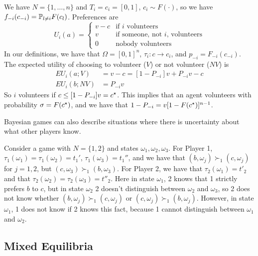 \documentclass[10pt]{article}
\begin{document}
\begin{example}
	 We have $N = \{1,\dots,n\}$ and $T_i = c_i = [0,1]$, $c_i \sim F(\cdot)$, so we have $f_{-i}(c_{-i}) = \mathbb{P}_{l\ne i} F(c_l)$. Preferences are \[U_i(a) = \begin{cases} v - c & \text{if $i$ volunteers} \\ v & \text{if someone, not $i$, volunteers} \\ 0 & \text{nobody volunteers} \end{cases}\]In our definitions, we have that $\Omega = [0,1]^n$, $\tau_i: c \to c_i$, and $p_{-i} = F_{-i}(c_{-i})$. The expected utility of choosing to volunteer ($V$) or not volunteer ($NV$) is \begin{align*} EU_i(a;V) &= v-c = [1-P_{-i}] v + P_{-i} v - c \\ EU_i(b;NV) &= P_{-i}v\end{align*}So $i$ volunteers if $c \le [1-P_{-i}]v = c^\star$. This implies that an agent volunteers with probability $\sigma = F(c^\star)$, and we have that $1-P_{-i} = v[1-F(c^\star)]^{n-1}$.
\end{example}


\begin{remark}
Bayesian games can also describe situations where there is uncertainty about what other players know.
\end{remark}

\begin{example}
	 Consider a game with $N = \{1,2\}$ and states $\omega_1,\omega_2,\omega_3$. For Player 1, $\tau_1(\omega_1) = \tau_1(\omega_2) = t_1'$, $\tau_1(\omega_3) = t_1''$, and we have that $(b,\omega_j) \succ_1 (c,\omega_j)$ for $j = 1,2$, but $(c,\omega_3) \succ_1 (b,\omega_3)$. For Player 2, we have that $\tau_2(\omega_1) = t'_2$ and that $\tau_2(\omega_2) = \tau_2(\omega_3) = t''_2$. Here in state $\omega_1$, 2 knows that 1 strictly prefers $b$ to $c$, but in state $\omega_2$ 2 doesn't distinguish between $\omega_2$ and $\omega_3$, so 2 does not know whether $(b,\omega_j) \succ_1 (c,\omega_j)$ or $(c,\omega_j) \succ_1 (b,\omega_j)$. However, in state $\omega_1$, 1 does not know if 2 knows this fact, because 1 cannot distinguish between $\omega_1$ and $\omega_2$.
\end{example}


\subsection{Mixed Equilibria}
\end{document}
